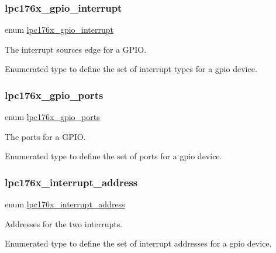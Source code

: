 \subsubsection{\texorpdfstring{lpc176x\_gpio\_interrupt}{lpc176x\_gpio\_interrupt}}
{\footnotesize\ttfamily enum \mbox{\hyperlink{gpio-defs_8h_afc30bf25b9862f6272f1bab077f8016b}{lpc176x\+\_\+gpio\+\_\+interrupt}}}



The interrupt sources edge for a G\+P\+IO. 

Enumerated type to define the set of interrupt types for a gpio device. \mbox{\label{gpio-defs_8h_a22c7c5bfd737b9395b232cfb69bde3e9}} 
\subsubsection{\texorpdfstring{lpc176x\_gpio\_ports}{lpc176x\_gpio\_ports}}
{\footnotesize\ttfamily enum \mbox{\hyperlink{gpio-defs_8h_a22c7c5bfd737b9395b232cfb69bde3e9}{lpc176x\+\_\+gpio\+\_\+ports}}}



The ports for a G\+P\+IO. 

Enumerated type to define the set of ports for a gpio device. \mbox{\label{gpio-defs_8h_acaa78f884cdd1863f772751af679e3e7}} 
\subsubsection{\texorpdfstring{lpc176x\_interrupt\_address}{lpc176x\_interrupt\_address}}
{\footnotesize\ttfamily enum \mbox{\hyperlink{gpio-defs_8h_acaa78f884cdd1863f772751af679e3e7}{lpc176x\+\_\+interrupt\+\_\+address}}}



Addresses for the two interrupts. 

Enumerated type to define the set of interrupt addresses for a gpio device. 